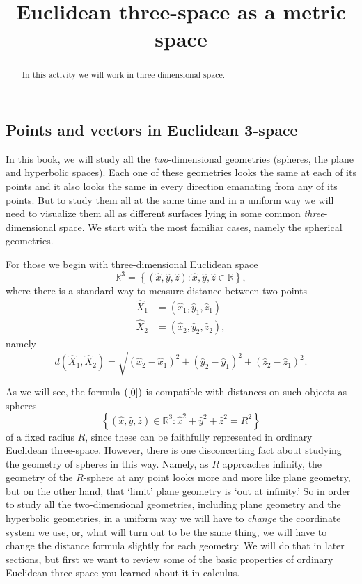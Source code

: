 \documentclass{ximera}
\title{Euclidean three-space as a metric space}
\begin{document}
\begin{abstract}
In this activity we will work in three dimensional space.
\end{abstract}
\maketitle

\subsection*{Points and vectors in Euclidean 3-space}

In this book, we will study all the \textit{two}-dimensional geometries
(spheres, the plane and hyperbolic spaces). Each one of these geometries looks
the same at each of its points and it also looks the same in every direction
emanating from any of its points. But to study them all at the same time and
in a uniform way we will need to visualize them all as different surfaces
lying in some common \textit{three}-dimensional space. We start with the most
familiar cases, namely the spherical geometries.

For those we begin with three-dimensional Euclidean space%
\[
\mathbb{R}^{3}=\left\{  \left(  \hat{x},\hat{y},\hat{z}\right)  :\hat{x}%
,\hat{y},\hat{z}\in\mathbb{R}\right\}  ,
\]
where there is a standard way to measure distance between two points%
\begin{align*}
\hat{X}_{1}  &  =\left(  \hat{x}_{1},\hat{y}_{1},\hat{z}_{1}\right) \\
\hat{X}_{2}  &  =\left(  \hat{x}_{2},\hat{y}_{2},\hat{z}_{2}\right)  ,
\end{align*}
namely%
\begin{equation}
d\left(  \hat{X}_{1},\hat{X}_{2}\right)  =\sqrt{\left(  \hat{x}_{2}-\hat
{x}_{1}\right)  ^{2}+\left(  \hat{y}_{2}-\hat{y}_{1}\right)  ^{2}+\left(
\hat{z}_{2}-\hat{z}_{1}\right)  ^{2}}. \label{0}%
\end{equation}


As we will see, the formula $\left(  \ref{0}\right)  $ is compatible with
distances on such objects as spheres%
\[
\left\{  \left(  \hat{x},\hat{y},\hat{z}\right)  \in\mathbb{R}^{3}:\hat{x}%
^{2}+\hat{y}^{2}+\hat{z}^{2}=R^{2}\right\}
\]
of a fixed radius $R$, since these can be faithfully represented in ordinary
Euclidean three-space. However, there is one disconcerting fact about studying
the geometry of spheres in this way. Namely, as $R$ approaches infinity, the
geometry of the $R$-sphere at any point looks more and more like plane
geometry, but on the other hand, that `limit' plane geometry is `out at
infinity.' So in order to study all the two-dimensional geometries, including
plane geometry and the hyperbolic geometries, in a uniform way we will have to
\textit{change} the coordinate system we use, or, what will turn out to be the
same thing, we will have to change the distance formula slightly for each
geometry. We will do that in later sections, but first we want to review some
of the basic properties of ordinary Euclidean three-space you learned about it
in calculus.
\end{document}
